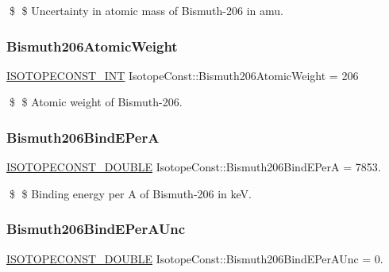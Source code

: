 \$ \$ Uncertainty in atomic mass of Bismuth-\/206 in amu. \mbox{\label{group___isotope_const-_bismuth-_bi206_gad795d53096260f0aa25bb3030b90d2d6}} 
\subsubsection{\texorpdfstring{Bismuth206\+Atomic\+Weight}{Bismuth206AtomicWeight}}
{\footnotesize\ttfamily \mbox{\hyperlink{group___isotope_const-_macros_ga5f18360b3e99483a35c32d789e62621c}{I\+S\+O\+T\+O\+P\+E\+C\+O\+N\+S\+T\+\_\+\+I\+NT}} Isotope\+Const\+::\+Bismuth206\+Atomic\+Weight = 206}

\$ \$ Atomic weight of Bismuth-\/206. \mbox{\label{group___isotope_const-_bismuth-_bi206_ga3d1e5a7a8cf3d40f5102e0abe3fd263f}} 
\subsubsection{\texorpdfstring{Bismuth206\+Bind\+E\+PerA}{Bismuth206BindEPerA}}
{\footnotesize\ttfamily \mbox{\hyperlink{group___isotope_const-_macros_ga8f45a7272ce02c0b4c65c44636ed719a}{I\+S\+O\+T\+O\+P\+E\+C\+O\+N\+S\+T\+\_\+\+D\+O\+U\+B\+LE}} Isotope\+Const\+::\+Bismuth206\+Bind\+E\+PerA = 7853.}

\$ \$ Binding energy per A of Bismuth-\/206 in keV. \mbox{\label{group___isotope_const-_bismuth-_bi206_ga6eb04ca817e9c26067992e4458525a8e}} 
\subsubsection{\texorpdfstring{Bismuth206\+Bind\+E\+Per\+A\+Unc}{Bismuth206BindEPerAUnc}}
{\footnotesize\ttfamily \mbox{\hyperlink{group___isotope_const-_macros_ga8f45a7272ce02c0b4c65c44636ed719a}{I\+S\+O\+T\+O\+P\+E\+C\+O\+N\+S\+T\+\_\+\+D\+O\+U\+B\+LE}} Isotope\+Const\+::\+Bismuth206\+Bind\+E\+Per\+A\+Unc = 0.}

